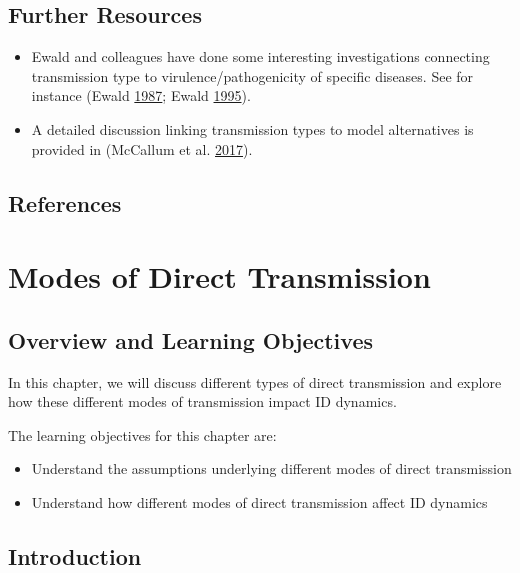 \documentclass[]{book}
\providecommand{\tightlist}{%
  \setlength{\itemsep}{0pt}\setlength{\parskip}{0pt}}
\theoremstyle{definition}
\theoremstyle{definition}
\theoremstyle{definition}
\theoremstyle{remark}
\begin{document}
\section{Further Resources}\label{further-resources-4}

\begin{itemize}
\tightlist
\item
  Ewald and colleagues have done some interesting investigations
  connecting transmission type to virulence/pathogenicity of specific
  diseases. See for instance (Ewald
  \protect\hyperlink{ref-ewald87}{1987}; Ewald
  \protect\hyperlink{ref-ewald95}{1995}).
\item
  A detailed discussion linking transmission types to model alternatives
  is provided in (McCallum et al.
  \protect\hyperlink{ref-mccallum17}{2017}).
\end{itemize}

\section{References}\label{references-5}

\chapter{Modes of Direct
Transmission}\label{modes-of-direct-transmission}

\section{Overview and Learning
Objectives}\label{overview-and-learning-objectives-5}

In this chapter, we will discuss different types of direct transmission
and explore how these different modes of transmission impact ID
dynamics.

The learning objectives for this chapter are:

\begin{itemize}
\tightlist
\item
  Understand the assumptions underlying different modes of direct
  transmission
\item
  Understand how different modes of direct transmission affect ID
  dynamics
\end{itemize}

\section{Introduction}\label{introduction-5}
\end{document}
